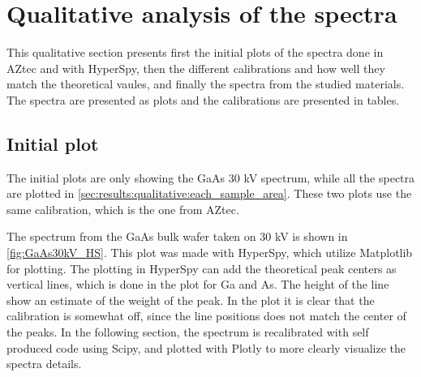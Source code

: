 













\section{Qualitative analysis of the spectra}
\label{sec:results:qualitative}


This qualitative section presents first the initial plots of the spectra done in AZtec and with HyperSpy, then the different calibrations and how well they match the theoretical vaules, and finally the spectra from the studied materials.
The spectra are presented as plots and the calibrations are presented in tables.



\subsection{Initial plot}
\label{sec:results:qualitative:initial_plot}

The initial plots are only showing the GaAs 30 kV spectrum, while all the spectra are plotted in \cref{sec:results:qualitative:each_sample_area}.
These two plots use the same calibration, which is the one from AZtec.




The spectrum from the GaAs bulk wafer taken on 30 kV is shown in \cref{fig:GaAs30kV_HS}.
This plot was made with HyperSpy, which utilize Matplotlib for plotting.
The plotting in HyperSpy can add the theoretical peak centers as vertical lines, which is done in the plot for Ga and As.
The height of the line show an estimate of the weight of the peak.
In the plot it is clear that the calibration is somewhat off, since the line positions does not match the center of the peaks.
In the following section, the spectrum is recalibrated with self produced code using Scipy, and plotted with Plotly to more clearly visualize the spectra details.


